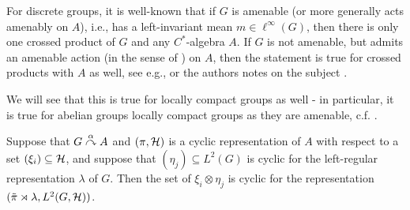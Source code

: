 For discrete groups, it is well-known that if $G$ is amenable (or more generally acts amenably on $A$), i.e., has a left-invariant mean $m \in \ell^\infty(G)$, then there is only one crossed product of $G$ and any $C^*$-algebra $A$. If $G$ is not amenable, but admits an amenable action (in the sense of \cite[Chapter 4.3]{brown2008c}) on $A$, then the statement is true for crossed products with $A$ as well, see e.g., \cite[4.3.4]{brown2008c} or the authors notes on the subject \cite[Part 2, pg. 26, 32]{approxtalk}.

We will see that this is true for locally compact groups as well - in particular, it is true for abelian groups locally compact groups as they are amenable, c.f. \cite[appendix G]{bekka2008kazhdan}.

\begin{lemma}
Suppose that $G \stackrel{\alpha}{\curvearrowright} A$ and $(\pi,\mathcal{H})$ is a cyclic representation of $A$ with respect to a set $(\xi_i) \subseteq \mathcal{H}$, and suppose that $(\eta_j) \subseteq L^2(G)$ is cyclic for the left-regular representation $\lambda$ of $G$. Then the set of $\xi_i \otimes \eta_j$ is cyclic for the representation $(\tilde \pi \rtimes \lambda, L^2(G,\mathcal{H}))$.
\label{mult:cyclic1}
\end{lemma}
